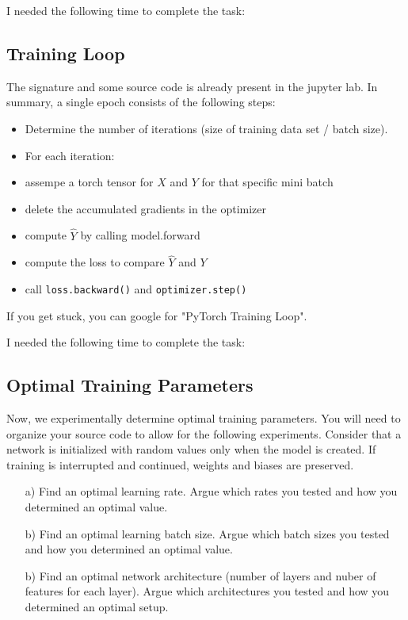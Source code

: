 I needed the following time to complete the task:

\subsection{Training Loop}

The signature and some source code is already present in the jupyter lab. In summary, a single epoch consists of the following steps:

\begin{itemize}
\item Determine the number of iterations (size of training data set / batch size).
\item For each iteration:
\item assempe a torch tensor for $X$ and $Y$ for that specific mini batch
\item delete the accumulated gradients in the optimizer
\item compute $\hat{Y}$ by calling model.forward
\item compute the loss to compare $\hat{Y}$ and $Y$
\item call \texttt{loss.backward()} and \texttt{optimizer.step()}
\end{itemize}

If you get stuck, you can google for "PyTorch Training Loop". 

I needed the following time to complete the task:

\subsection{Optimal Training Parameters}

Now, we experimentally determine optimal training parameters. You will need to organize your source code to allow for the following experiments. Consider that a network is initialized with random values only when the model is created. If training is interrupted and continued, weights and biases are preserved.

\begin{enumerate}

\item[a)] Find an optimal learning rate. Argue which rates you tested and how you determined an optimal value.

\item[b)] Find an optimal learning batch size. Argue which batch sizes you tested and how you determined an optimal value.

\item[b)] Find an optimal network architecture (number of layers and nuber of features for each layer). Argue which architectures you tested and how you determined an optimal setup.

\end{enumerate}

